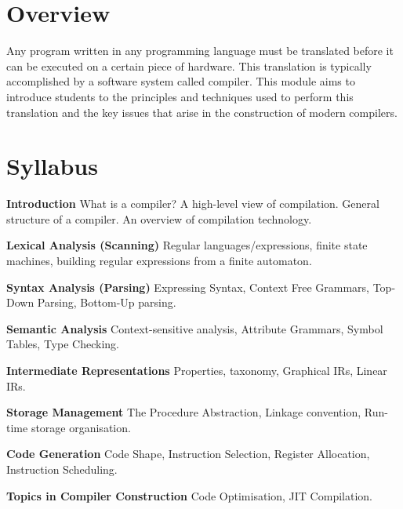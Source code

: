 \section*{Overview}

Any program written in any programming language must be translated before it can be executed on a certain piece of hardware. This translation is typically accomplished by a software system called compiler. This module aims to introduce students to the principles and techniques used to perform this translation and the key issues that arise in the construction of modern compilers.

\section*{Syllabus}
\begin{mymulticols}
\begin{description}
\item \textbf{Introduction}
What is a compiler? A high-level view of compilation. General structure of a 
compiler. An overview of compilation technology.

\item \textbf{Lexical Analysis (Scanning)}
Regular languages/expressions, finite state machines, building regular
expressions from a finite automaton.

\item \textbf{Syntax Analysis (Parsing)}
Expressing Syntax, Context Free Grammars, Top-Down Parsing, Bottom-Up parsing.

\item \textbf{Semantic Analysis}
Context-sensitive analysis, Attribute Grammars, Symbol Tables, Type Checking.

\item \textbf{Intermediate Representations}
Properties, taxonomy, Graphical IRs, Linear IRs.

\item \textbf{Storage Management}
The Procedure Abstraction, Linkage convention, Run-time storage organisation.

\item \textbf{Code Generation}
Code Shape, Instruction Selection, Register Allocation, Instruction Scheduling.

\item \textbf{Topics in Compiler Construction}
Code Optimisation, JIT Compilation.
\end{description}
\end{mymulticols}

